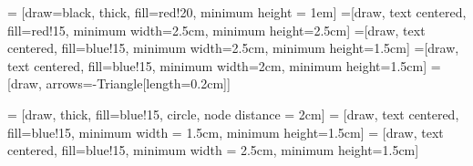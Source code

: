 
 = [draw=black, thick, fill=red!20, minimum height = 1em]
 =[draw, text centered, fill=red!15, minimum width=2.5cm, minimum height=2.5cm]
 =[draw, text centered, fill=blue!15, minimum width=2.5cm, minimum height=1.5cm]
 =[draw, text centered, fill=blue!15, minimum width=2cm, minimum height=1.5cm]
 = [draw, arrows={-Triangle[length=0.2cm]}]

 = [draw, thick, fill=blue!15, circle, node distance = 2cm]
 = [draw, text centered, fill=blue!15, minimum width = 1.5cm,
minimum height=1.5cm]
 = [draw, text centered, fill=blue!15, minimum width = 2.5cm,
minimum height=1.5cm]

